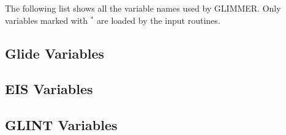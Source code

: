 \label{ug.sec.varlist}
The following list shows all the variable names used by GLIMMER. Only variables marked with $^\ast$ are loaded by the input routines.
\subsection{Glide Variables}

\subsection{EIS Variables}

\subsection{GLINT Variables}

